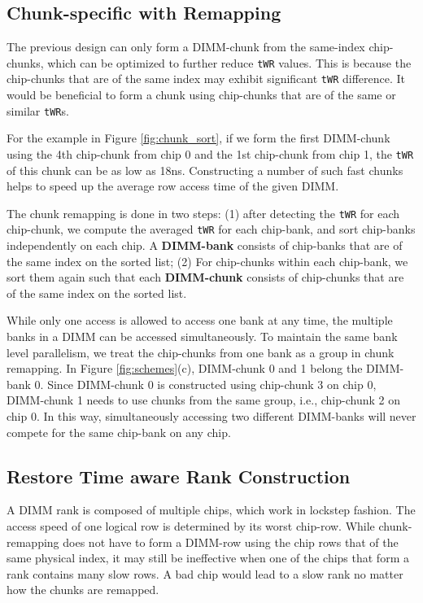 \subsection{Chunk-specific with Remapping}

The previous design can only form a DIMM-chunk from the same-index chip-chunks, which can be optimized to further reduce {\tt tWR} values. This is because the chip-chunks that are of the same index may exhibit significant {\tt tWR} difference. It would be beneficial to form a chunk using chip-chunks that are of the same or similar {\tt tWR}s. 

For the example in Figure \ref{fig:chunk_sort}, if we form the first DIMM-chunk using the 4th chip-chunk from chip 0 and the 1st chip-chunk from chip 1, the {\tt tWR} of this chunk can be as low as 18ns. Constructing a number of such fast chunks helps to speed up the average row access time of the given DIMM.

The chunk remapping is done in two steps: (1) after detecting the {\tt tWR} for each chip-chunk, we compute the averaged {\tt tWR} for each chip-bank, and sort chip-banks independently on each chip. A {\bf DIMM-bank} consists of chip-banks that are of the same index on the sorted list; (2) For chip-chunks within each chip-bank, we sort them again such that each {\bf DIMM-chunk} consists of chip-chunks that are of the same index on the sorted list. 

While only one access is allowed to access one bank at any time, the multiple banks in a DIMM can be accessed simultaneously. To maintain the same bank level parallelism, we treat the chip-chunks from one bank as a group in chunk remapping. In Figure \ref{fig:schemes}(c), 
DIMM-chunk 0 and 1 belong the DIMM-bank 0. Since DIMM-chunk 0 is constructed using chip-chunk 3 on chip 0, DIMM-chunk 1 needs to use chunks from the same group, i.e., chip-chunk 2 on chip 0. In this way, simultaneously accessing two different DIMM-banks will never compete for the same chip-bank on any chip. 

\subsection{Restore Time aware Rank Construction}
\label{sec:match_twr}

A DIMM rank is composed of multiple chips, which work in lockstep fashion. The access speed of one logical row is determined by its worst chip-row. While chunk-remapping does not have to form a DIMM-row using the chip rows that of the same physical index, it may still be ineffective when one of the chips that form a rank contains many slow rows. A bad chip would lead to a slow rank no matter how the chunks are remapped.

